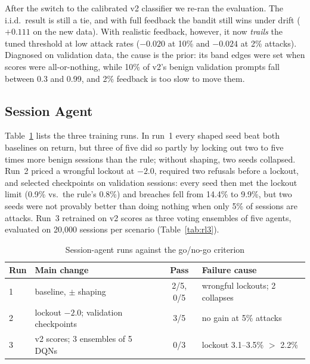 \documentclass[conference]{IEEEtran}
\begin{document}
After the switch to the calibrated v2 classifier we re-ran the evaluation.
The i.i.d.\ result is still a tie, and with full feedback the bandit still
wins under drift ($+0.111$ on the new data). With realistic feedback,
however, it now \emph{trails} the tuned threshold at low attack rates
($-0.020$ at 10\% and $-0.024$ at 2\% attacks). Diagnosed on validation
data, the cause is the prior: its band edges were set when scores were
all-or-nothing, while 10\% of v2's benign validation prompts fall between
0.3 and 0.99, and 2\% feedback is too slow to move them.

\subsection{Session Agent}

Table~\ref{tab:rl} lists the three training runs. In run~1 every shaped
seed beat both baselines on return, but three of five did so partly by
locking out two to five times more benign sessions than the rule; without
shaping, two seeds collapsed. Run~2 priced a wrongful lockout at $-2.0$,
required two refusals before a lockout, and selected checkpoints on
validation sessions: every seed then met the lockout limit (0.9\% vs.\ the
rule's 0.8\%) and breaches fell from 14.4\% to 9.9\%, but two seeds were
not provably better than doing nothing when only 5\% of sessions are
attacks. Run~3 retrained on v2 scores as three voting ensembles of five
agents, evaluated on 20{,}000 sessions per scenario
(Table~\ref{tab:rl3}).

\begin{table}[t]
\caption{Session-agent runs against the go/no-go criterion}
\label{tab:rl}
\centering
\footnotesize
\setlength{\tabcolsep}{3pt}
\begin{tabular}{p{4mm}p{27mm}cp{25mm}}
\toprule
Run & Main change & Pass & Failure cause \\
\midrule
1 & baseline, $\pm$ shaping & 2/5, 0/5 & wrongful lockouts; 2 collapses \\
2 & lockout $-2.0$; validation checkpoints & 3/5 & no gain at 5\% attacks \\
3 & v2 scores; 3 ensembles of 5 DQNs & 0/3 & lockout 3.1--3.5\% $>$ 2.2\% \\
\bottomrule
\end{tabular}
\end{table}
\end{document}
